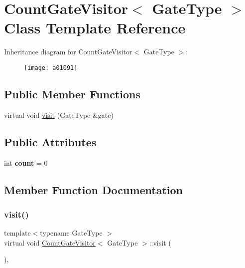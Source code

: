 \hypertarget{a01091}{}\section{Count\+Gate\+Visitor$<$ Gate\+Type $>$ Class Template Reference}
\label{a01091}
Inheritance diagram for Count\+Gate\+Visitor$<$ Gate\+Type $>$\+:\begin{figure}[H]
\begin{center}
\leavevmode
\texttt{[image: a01091]}
\end{center}
\end{figure}
\subsection*{Public Member Functions}
\begin{DoxyCompactItemize}
\item 
virtual void \hyperlink{a01091_a144f1e4e6d24c450e0a941fa650c1f48}{visit} (Gate\+Type \&gate)
\end{DoxyCompactItemize}
\subsection*{Public Attributes}
\begin{DoxyCompactItemize}
\item 
\mbox{\label{a01091_a74c1ba58befe42d9dbdbd5eb14aa46ca}} 
int {\bfseries count} = 0
\end{DoxyCompactItemize}


\subsection{Member Function Documentation}
\mbox{\label{a01091_a144f1e4e6d24c450e0a941fa650c1f48}} 
\subsubsection{\texorpdfstring{visit()}{visit()}}
{\footnotesize\ttfamily template$<$typename Gate\+Type $>$ \\
virtual void \hyperlink{a01091}{Count\+Gate\+Visitor}$<$ Gate\+Type $>$\+::visit (\begin{DoxyParamCaption}\item[{Gate\+Type \&}]{ }\end{DoxyParamCaption})\hspace{0.3cm}{\ttfamily [inline]}, {\ttfamily [virtual]}}

